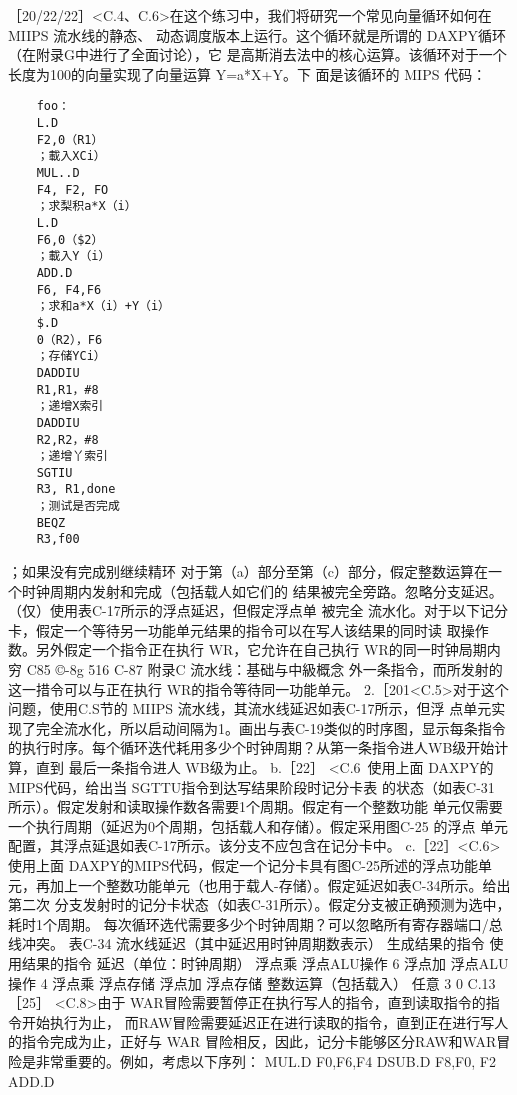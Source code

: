 ［20/22/22］<C.4、C.6>在这个练习中，我们将研究一个常见向量循环如何在 MIIPS 流水线的静态、
动态调度版本上运行。这个循环就是所谓的 DAXPY循环（在附录G中进行了全面讨论），它
是高斯消去法中的核心运算。该循环对于一个长度为100的向量实现了向量运算 Y=a*X+Y。下
面是该循环的 MIPS 代码：
\begin{verbatim}
    foo：
    L.D
    F2,0（R1）
    ；載入XCi）
    MUL..D
    F4, F2, FO
    ；求梨积a*X（i）
    L.D
    F6,0（$2）
    ；載入Y（i）
    ADD.D
    F6, F4,F6
    ；求和a*X（i）+Y（i）
    $.D
    0（R2），F6
    ；存储YCi）
    DADDIU
    R1,R1，#8
    ；递增X索引
    DADDIU
    R2,R2，#8
    ；递增丫索引
    SGTIU
    R3, R1,done
    ；测试是否完成
    BEQZ
    R3,f00
\end{verbatim}
；如果没有完成别继续精环
对于第（a）部分至第（c）部分，假定整数运算在一个时钟周期内发射和完成（包括载人如它们的
结果被完全旁路。忽略分支延迟。（仅）使用表C-17所示的浮点延迟，但假定浮点单
被完全
流水化。对于以下记分卡，假定一个等待另一功能单元结果的指令可以在写人该结果的同时读
取操作数。另外假定一个指令正在执行 WR，它允许在自己执行 WR的同一时钟局期内
穷
C85
©-8g
516
C-87
附录C 流水线：基础与中級概念
外一条指令，而所发射的这一措令可以与正在执行 WR的指令等待同一功能单元。
2.［201<C.5>对于这个问题，使用C.S节的 MIIPS 流水线，其流水线延迟如表C-17所示，但浮
点单元实现了完全流水化，所以启动间隔为1。画出与表C-19类似的时序图，显示每条指令
的执行时序。每个循环迭代耗用多少个时钟周期？从第一条指令进人WB级开始计算，直到
最后一条指令进人 WB级为止。
b.［22］ <C.6~使用上面 DAXPY的MIPS代码，给出当 SGTTU指令到达写结果阶段时记分卡表
的状态（如表C-31 所示）。假定发射和读取操作数各需要1个周期。假定有一个整数功能
单元仅需要一个执行周期（延迟为0个周期，包括载人和存储）。假定采用图C-25 的浮点
单元配置，其浮点延退如表C-17所示。该分支不应包含在记分卡中。
c.［22］<C.6>使用上面 DAXPY的MIPS代码，假定一个记分卡具有图C-25所述的浮点功能单
元，再加上一个整数功能单元（也用于载人-存储）。假定延迟如表C-34所示。给出第二次
分支发射时的记分卡状态（如表C-31所示）。假定分支被正确预测为选中，耗时1个周期。
每次循环选代需要多少个时钟周期？可以忽略所有寄存器端口/总线冲突。
表C-34 流水线延迟（其中延迟用时钟周期数表示）
生成结果的指令
使用结果的指令
延迟（单位：时钟周期）
浮点乘
浮点ALU操作
6
浮点加
浮点ALU操作
4
浮点乘
浮点存储
浮点加
浮点存储
整数运算（包括载入）
任意
3
0
C.13［25］ <C.8>由于 WAR冒险需要暂停正在执行写人的指令，直到读取指令的指令开始执行为止，
而RAW冒险需要延迟正在进行读取的指令，直到正在进行写人的指令完成为止，正好与 WAR
冒险相反，因此，记分卡能够区分RAW和WAR冒险是非常重要的。例如，考虑以下序列：
MUL.D
F0,F6,F4
DSUB.D
F8,F0, F2
ADD.D
